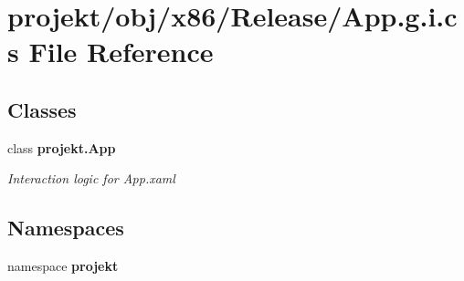 \section{projekt/obj/x86/\+Release/\+App.g.\+i.\+cs File Reference}
\label{x86_2Release_2App_8g_8i_8cs}
\subsection*{Classes}
\begin{DoxyCompactItemize}
\item 
class \textbf{ projekt.\+App}
\begin{DoxyCompactList}\small\item\em Interaction logic for App.\+xaml \end{DoxyCompactList}\end{DoxyCompactItemize}
\subsection*{Namespaces}
\begin{DoxyCompactItemize}
\item 
namespace \textbf{ projekt}
\end{DoxyCompactItemize}

